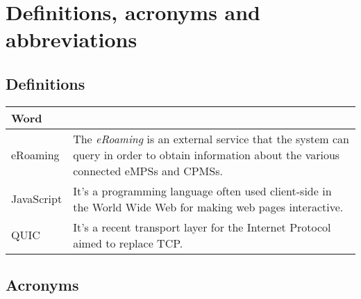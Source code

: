 \section{Definitions, acronyms and abbreviations}

\subsection{Definitions}

\begin{center}
    \begin{tabular}{ | >{\centering\arraybackslash}m{} | >{\arraybackslash}m{} | }
        \hline
        \textbf{Word} & \multicolumn{1}{c|}{\textbf{Definition}} \\
        \hline
        \hline
        eRoaming & The \textit{eRoaming} is an external service that the system can query in order to obtain information about the various connected eMPSs and CPMSs. \\
        \hline
        JavaScript & It's a programming language often used client-side in the World Wide Web for making web pages interactive. \\
        \hline
        QUIC & It's a recent transport layer for the Internet Protocol aimed to replace TCP. \\
        \hline
    \end{tabular}
\end{center}

\subsection{Acronyms}

